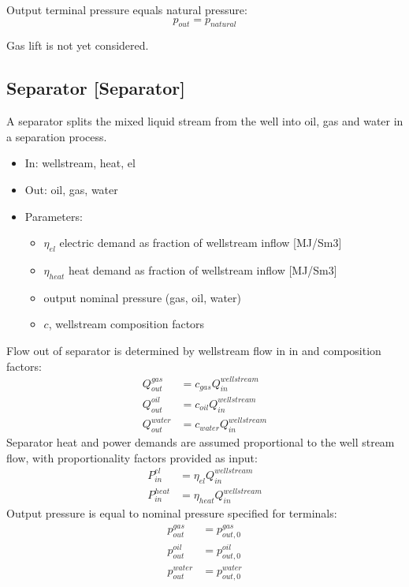 \documentclass[12pt]{article}
\begin{document}
\medskip\noindent
Output terminal pressure equals natural pressure:
 \begin{equation}
 	p_{out}=p_{natural} 
 \end{equation}

Gas lift is not yet considered.





\subsection{Separator [Separator]}

A separator splits the mixed liquid stream from the well into oil, gas and water in a separation process. 

\begin{itemize}
\item In: wellstream, heat, el
\item Out: oil, gas, water
\item Parameters:
\begin{itemize}[noitemsep,topsep=0pt]
	\item $ \eta _{el}$ electric demand as fraction of wellstream inflow [MJ/Sm3]
	\item $ \eta _{heat}$ heat demand as fraction of wellstream inflow [MJ/Sm3]
	\item output nominal pressure (gas, oil, water)
	\item $c$, wellstream composition factors
\end{itemize}
\end{itemize}



Flow out of separator is determined by wellstream flow in in and composition factors:
 \begin{align}
 Q_{out}^{gas} &=c_{gas}Q_{in}^{wellstream} \\
 Q_{out}^{oil} &=c_{oil}Q_{in}^{wellstream} \\
 Q_{out}^{water} &=c_{water}Q_{in}^{wellstream} 
 \end{align}
Separator heat and power demands are assumed proportional to the well stream flow, 
with proportionality factors provided as input:
\begin{align}
	P_{in}^{el} 		&= \eta _{el}Q_{in}^{wellstream}\\
	P_{in}^{heat}	&= \eta _{heat}Q_{in}^{wellstream}
\end{align}
%
Output pressure is equal to nominal pressure specified for terminals:
\begin{align}
 p_{out}^{gas}		&=p_{out,0}^{gas} \\
 p_{out}^{oil}		&=p_{out,0}^{oil} \\
 p_{out}^{water}	&=p_{out,0}^{water} 
 \end{align}
\end{document}

